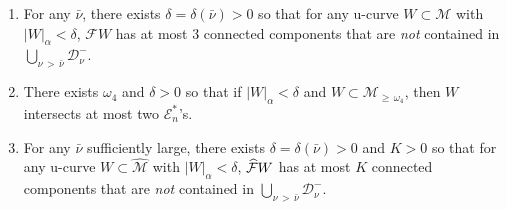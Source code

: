 \documentclass[AHL, Unicode, longabstracts,published]{cedram}
\newcommand{\cEs}{\mathcal E^{*}}
\newcommand{\cm}{\mathcal{F}}
\newcommand{\cell}{\mathcal{D}}
\newcommand{\csp}{\mathcal{M}}
\newcommand{\cmp}{\hat\cm}
\newcommand{\cspl}[1]{\csp_{\ge\,#1}}
\newcommand{\cspi}{\widehat{\csp}}
\newcommand{\law}[1]{\omega_{#1}}
\newcommand{\adm}{_{\alpha^{+}}}
\newcommand{\indCell}{\nu}
\renewcommand{\adm}{_{\alpha}}
\newcommand*{\relabel}{\renewcommand{\labelenumi}{(\theenumi)}}
\newcommand*{\alphenumi}{\renewcommand*{\theenumi}{\alph{enumi}}\relabel}
\let\oldhat\hat
\renewcommand*{\hat}[1]{\mathchoice{\widehat{#1}}{\widehat{#1}}{\oldhat{#1}}{\oldhat{#1}}}
\begin{document}
\pagebreak
\begin{lemm}\label{l_largeCell}
\leavevmode
\begin{enumerate}\alphenumi
\item\label{i_almostFinite}
For any $\bar\indCell$, there exists $\delta =\delta(\bar\indCell) > 0$ so that for any u-curve $W\subset\csp$ with $|W|\adm < \delta$, $\cm W$ has at most $3$ connected components that are \emph{not} contained in $\bigcup_{\indCell\,>\,\bar\indCell}\cell^-_\indCell$.
\item\label{i_almostFinite-large}
There exists $\law4$ and $\delta > 0$ so that if $|W|\adm < \delta$ and $W\subset\cspl{\law4}$, then $W$ intersects at most two $\cEs_{n}$'s.
\item\label{i_almostFinite-induced}
For any $\bar\indCell$ sufficiently large, there exists $\delta =\delta(\bar\indCell) > 0$ and $K > 0$ so that for any u-curve $W\subset\cspi$ with $|W|\adm < \delta$, $\cmp W$ has at most $K$ connected components that are \emph{not} contained in $\bigcup_{\indCell\,>\,\bar\indCell}\cell^-_\indCell$.
\end{enumerate}
\end{lemm}
\end{document}
